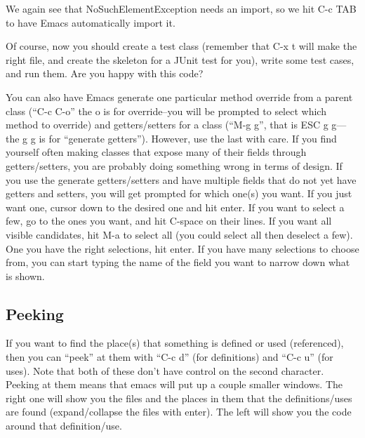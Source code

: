 \documentclass[12pt]{article}
\begin{document}
We again see that NoSuchElementException needs an import, so we
hit C-c TAB to have Emacs automatically import it.

Of course, now you should create a test class (remember that C-x t will
make the right file, and create the skeleton for a JUnit test for you),
write some test cases, and run them.  Are you happy with this code?

You can also have Emacs generate one particular method override from a
parent class (``C-c C-o'' the o is for override--you will be prompted
to select which method to override) and getters/setters for a class
(``M-g g'', that is ESC g g---the g g is for ``generate getters'').
However, use the last with care.  If you find yourself often making
classes that expose many of their fields through getters/setters, you
are probably doing something wrong in terms of design.
If you use the generate getters/setters and have multiple fields
that do not yet have getters and setters, you will get prompted for which
one(s) you want.  If you just want one, cursor down to the desired one and
hit enter.  If you want to select a few, go to the ones you want, and hit
C-space on their lines.  If you want all visible candidates, hit M-a to
select all (you could select all then deselect a few). One you have the right
selections, hit enter.  If you have many selections to choose from, you can start
typing the name of the field you want to narrow down what is shown.



\subsection{Peeking}
If you want to find the place(s) that something is defined or used
(referenced), then you can ``peek'' at them with ``C-c d'' (for
definitions) and ``C-c u'' (for uses).  Note that both
of these don't have control on the second character.
Peeking at them means that emacs
will put up a couple smaller windows. The right one will
show you the files and the places in them that the definitions/uses are
found (expand/collapse the files with enter).  The left will show you
the code around that definition/use.

\end{document}
